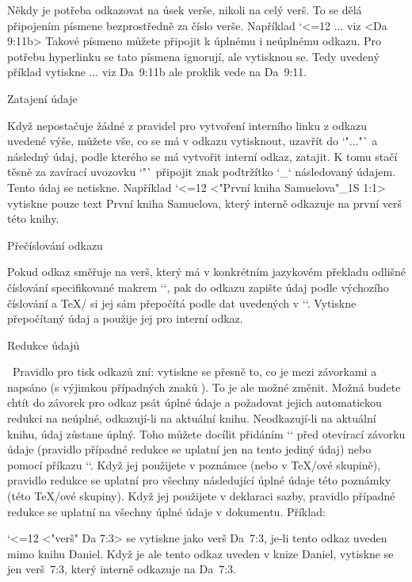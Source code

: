 Někdy je potřeba odkazovat na úsek verše, nikoli na celý verš. To se dělá
připojením písmene bezprostředně za číslo verše. Například
\begtt \catcode`<=12
... viz <Da 9:11b>
\endtt
Takové písmeno můžete připojit k úplnému i neúplnému odkazu. Pro potřebu
hyperlinku se tato písmena ignorují, ale vytisknou se. Tedy uvedený příklad
vytiskne ... viz {\Blue Da~9:11b} ale proklik vede na Da~9:11.

\secc Zatajení údaje

Když nepostačuje žádné z pravidel pro vytvoření interního linku z odkazu
uvedené výše, můžete vše, co se má v odkazu
vytisknout, uzavřít do `"..."` a následný údaj, podle kterého se má vytvořit interní
odkaz, zatajit. K tomu stačí těsně za zavírací uvozovku `"` připojit znak
podtržítko `_` následovaný údajem. Tento údaj se netiskne. Například
\begtt \catcode`<=12
<"První kniha Samuelova"_1S 1:1>
\endtt
vytiskne pouze text {\Blue První kniha Samuelova}, který interně odkazuje na první
verš této knihy.

\secc Přečíslování odkazu

Pokud odkaz směřuje na verš, který má v konkrétním jazykovém překladu odlišné
číslování specifikované makrem `\renum`, pak do odkazu zapište údaj podle
výchozího číslování a \TeX/ si jej sám přepočítá podle dat uvedených v
`\renum`. Vytiskne přepočítaný údaj a použije jej pro interní odkaz.

\secc Redukce údajů

\TODO\
Pravidlo pro tisk odkazů zní: vytiskne se přesně to, co je mezi
závorkami \code{\<} a \code{\>} napsáno (s výjimkou případných znaků ).
To je ale možné změnit.
Možná budete chtít do závorek pro odkaz psát úplné údaje a požadovat jejich automatickou 
redukci na neúplné, odkazují-li na aktuální knihu.
Neodkazují-li na aktuální knihu, údaj zůstane úplný. Toho můžete docílit
přidáním `\re` před otevírací závorku údaje (pravidlo případné redukce 
se uplatní jen na tento jediný údaj) nebo pomocí příkazu `\reduceref`. Když jej
použijete v poznámce (nebo v \TeX/ové skupině), pravidlo redukce se uplatní 
pro všechny následující úplné údaje této poznámky (této \TeX/ové skupiny). 
Když jej použijete v deklaraci sazby,
pravidlo případné redukce se uplatní na všechny úplné údaje v dokumentu. 
Příklad:

\begtt \catcode`<=12
\re<"verš" Da 7:3>
\endtt
se vytiskne jako {\Blue verš Da~7:3}, je-li tento odkaz uveden mimo knihu
Daniel. Když je ale tento odkaz uveden v knize Daniel, vytiskne se
jen {\Blue verš~7:3}, který interně odkazuje na Da~7:3. 

